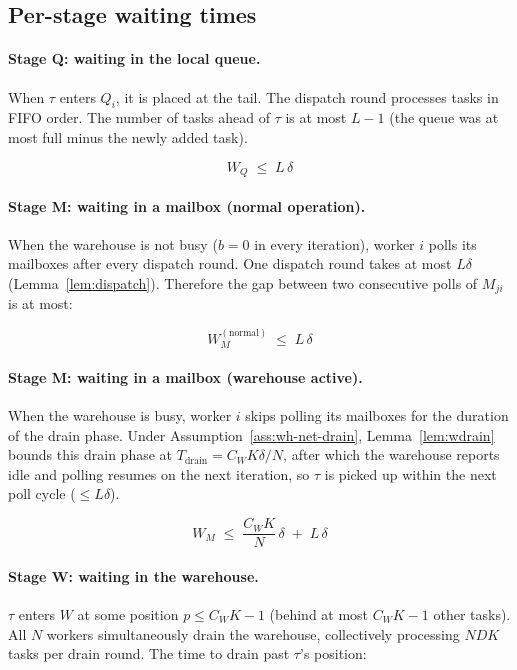 \documentclass[11pt,a4paper]{report}
\begin{document}
\subsection{Per-stage waiting times}
\label{sec:cases}

\paragraph{Stage Q: waiting in the local queue.}

When $\tau$ enters $Q_i$, it is placed at the tail.  The
dispatch round processes tasks in FIFO order.  The number of
tasks ahead of $\tau$ is at most $L-1$ (the queue was at most full
minus the newly added task).

\[
  W_Q \;\leq\; L\,\delta
\]

\paragraph{Stage M: waiting in a mailbox (normal operation).}

When the warehouse is not busy ($b=0$ in every iteration),
worker $i$ polls its mailboxes after every dispatch round.
One dispatch round takes at most
$L\delta$ (Lemma~\ref{lem:dispatch}).  Therefore the gap between
two consecutive polls of $M_{ji}$ is at most:

\[
  W_M^{(\text{normal})} \;\leq\; L\,\delta
\]

\paragraph{Stage M: waiting in a mailbox (warehouse active).}

When the warehouse is busy, worker $i$ skips polling its mailboxes
for the duration of the drain phase.  Under
Assumption~\ref{ass:wh-net-drain}, Lemma~\ref{lem:wdrain} bounds this
drain phase at $T_{\mathrm{drain}} = C_W K\delta/N$, after which
the warehouse reports idle and polling resumes on the
next iteration, so $\tau$ is picked up within the next poll cycle
($\leq L\delta$).

\[
  W_M \;\leq\; \frac{C_W K}{N}\,\delta \;+\; L\,\delta
\]

\paragraph{Stage W: waiting in the warehouse.}

$\tau$ enters $W$ at some position $p \leq C_W K - 1$ (behind at
most $C_W K - 1$ other tasks).  All $N$ workers simultaneously
drain the warehouse, collectively processing $NDK$ tasks per drain
round.  The time to drain past $\tau$'s position:
\end{document}
